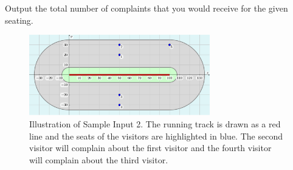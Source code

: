 \begin{Output}
	Output the total number of complaints that you would receive for the given seating.
\end{Output}

\begin{figure}[!h]
	\centering
	\includegraphics[width=0.7\textwidth]{sample2}
	\caption{Illustration of Sample Input 2.
		The running track is drawn as a red line and the seats of the visitors are highlighted in blue.
		The second visitor will complain about the first visitor and the fourth visitor will complain about the third visitor.}
\end{figure}

